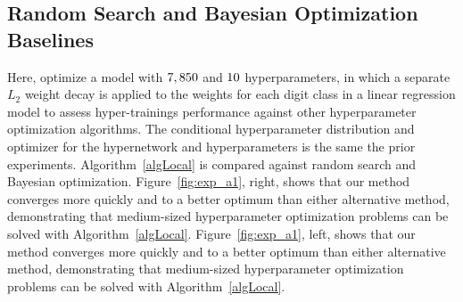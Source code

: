 \documentclass{article} %
\begin{document}
\subsection{Random Search and Bayesian Optimization Baselines}
Here, optimize a model with $7,850$ and $10$ hyperparameters, in which a separate $L_{2}$ weight decay is applied to the weights for each digit class in a linear regression model to assess hyper-trainings performance against other hyperparameter optimization algorithms.
The conditional hyperparameter distribution and optimizer for the hypernetwork and hyperparameters is the same the prior experiments.
Algorithm~\ref{algLocal} is compared against random search and Bayesian optimization.
%
Figure~\ref{fig:exp_a1}, right, shows that our method converges more quickly and to a better optimum than either alternative method, demonstrating that medium-sized hyperparameter optimization problems can be solved with Algorithm~\ref{algLocal}.
Figure~\ref{fig:exp_a1}, left, shows that our method converges more quickly and to a better optimum than either alternative method, demonstrating that medium-sized hyperparameter optimization problems can be solved with Algorithm~\ref{algLocal}.
%
\end{document}

